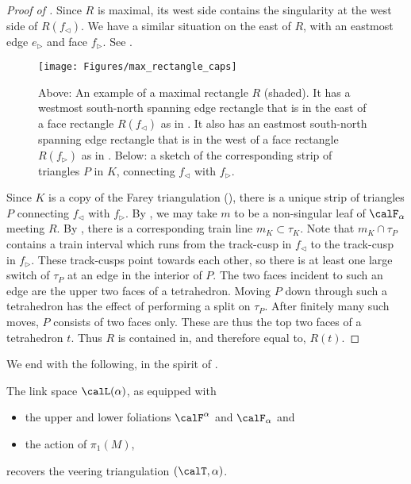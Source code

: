 \documentclass[12pt]{amsart}
\begin{document}
\begin{proof}[Proof of ]
Since $R$ is maximal, its west side contains the singularity at the west side of $R(f_\triangleleft)$.  We have a similar situation on the east of $R$, with an eastmost edge $e_\triangleright$ and face $f_\triangleright$.  See .

\begin{figure}[htbp]
\centering
\texttt{[image: Figures/max\_rectangle\_caps]}
\caption{Above: An example of a maximal rectangle $R$ (shaded).  It has a westmost south-north spanning edge rectangle that is in the east of a face rectangle $R(f_\triangleleft)$ as in .  It also has an eastmost south-north spanning edge rectangle that is in the west of a face rectangle $R(f_\triangleright)$ as in .  Below: a sketch of the corresponding strip of triangles $P$ in $K$, connecting $f_\triangleleft$ with $f_\triangleright$.} 
\label{Fig:MaxRectangleCaps}
\end{figure}

Since $K$ is a copy of the Farey triangulation (), there is a unique strip of triangles $P$ connecting $f_\triangleleft$ with $f_\triangleright$.  By , we may take $m$ to be a non-singular leaf of $\calF_\alpha$ meeting $R$. By , there is a corresponding train line $m_K \subset \tau_K$. Note that $m_K \cap \tau_P$ contains a train interval which runs from the track-cusp in $f_\triangleleft$ to the track-cusp in $f_\triangleright$.  These track-cusps point towards each other, so there is at least one large switch of $\tau_P$ at an edge in the interior of $P$.  The two faces incident to such an edge are the upper two faces of a tetrahedron. Moving $P$ down through such a tetrahedron has the effect of performing a split on $\tau_P$.  After finitely many such moves, $P$ consists of two faces only. These are thus the top two faces of a tetrahedron $t$. Thus $R$ is contained in, and therefore equal to, $R(t)$.
\end{proof}

We end with the following, in the spirit of \cite[Theorem~1.1]{Gueritaud16}.

\begin{theorem}
\label{Thm:Gueritaud}
The link space $\calL(\alpha)$, as equipped with
\begin{itemize}
\item
the upper and lower foliations $\calF^\alpha$ and $\calF_\alpha$ and 
\item
the action of $\pi_1(M)$,
\end{itemize}
recovers the veering triangulation $(\calT, \alpha)$. 
\end{theorem}
\end{document}
